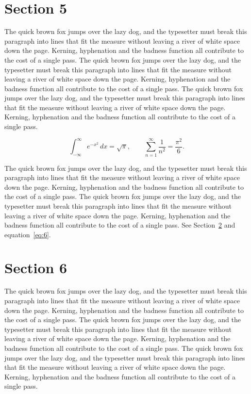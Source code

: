 \documentclass{article}
\begin{document}
\section{Section 5}
\label{sec:5}
The quick brown fox jumps over the lazy dog, and the typesetter must break this paragraph into lines that fit the measure without leaving a river of white space down the page. Kerning, hyphenation and the badness function all contribute to the cost of a single pass. The quick brown fox jumps over the lazy dog, and the typesetter must break this paragraph into lines that fit the measure without leaving a river of white space down the page. Kerning, hyphenation and the badness function all contribute to the cost of a single pass. The quick brown fox jumps over the lazy dog, and the typesetter must break this paragraph into lines that fit the measure without leaving a river of white space down the page. Kerning, hyphenation and the badness function all contribute to the cost of a single pass. 

\begin{equation}\label{eq:5}
\int_{-\infty}^{\infty} e^{-x^{2}}\,dx = \sqrt{\pi}, \qquad
\sum_{n=1}^{\infty} \frac{1}{n^{2}} = \frac{\pi^{2}}{6}.
\end{equation}

The quick brown fox jumps over the lazy dog, and the typesetter must break this paragraph into lines that fit the measure without leaving a river of white space down the page. Kerning, hyphenation and the badness function all contribute to the cost of a single pass. The quick brown fox jumps over the lazy dog, and the typesetter must break this paragraph into lines that fit the measure without leaving a river of white space down the page. Kerning, hyphenation and the badness function all contribute to the cost of a single pass. 
See Section~\ref{sec:6} and equation~\eqref{eq:6}.
\section{Section 6}
\label{sec:6}
The quick brown fox jumps over the lazy dog, and the typesetter must break this paragraph into lines that fit the measure without leaving a river of white space down the page. Kerning, hyphenation and the badness function all contribute to the cost of a single pass. The quick brown fox jumps over the lazy dog, and the typesetter must break this paragraph into lines that fit the measure without leaving a river of white space down the page. Kerning, hyphenation and the badness function all contribute to the cost of a single pass. The quick brown fox jumps over the lazy dog, and the typesetter must break this paragraph into lines that fit the measure without leaving a river of white space down the page. Kerning, hyphenation and the badness function all contribute to the cost of a single pass. 
\end{document}
